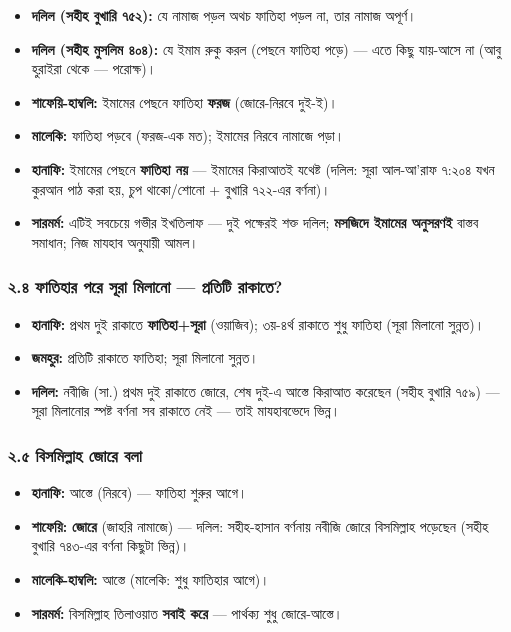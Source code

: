 \begin{itemize}
\item \textbf{দলিল (সহীহ বুখারি ৭৫২):} যে নামাজ পড়ল অথচ ফাতিহা পড়ল না, তার নামাজ অপূর্ণ।
\item \textbf{দলিল (সহীহ মুসলিম ৪০৪):} যে ইমাম রুকু করল (পেছনে ফাতিহা পড়ে) — এতে কিছু যায়-আসে না (আবু হুরাইরা থেকে — পরোক্ষ)।
\item \textbf{শাফেয়ি-হাম্বলি:} ইমামের পেছনে ফাতিহা \textbf{ফরজ} (জোরে-নিরবে দুই-ই)।
\item \textbf{মালেকি:} ফাতিহা পড়বে (ফরজ-এক মত); ইমামের নিরবে নামাজে পড়া।
\item \textbf{হানাফি:} ইমামের পেছনে \textbf{ফাতিহা নয়} — ইমামের কিরাআতই যথেষ্ট (দলিল: সূরা আল-আ'রাফ ৭:২০৪ যখন কুরআন পাঠ করা হয়, চুপ থাকো/শোনো + বুখারি ৭২২-এর বর্ণনা)।
\item \textbf{সারমর্ম:} এটিই সবচেয়ে গভীর ইখতিলাফ — দুই পক্ষেরই শক্ত দলিল; \textbf{মসজিদে ইমামের অনুসরণই} বাস্তব সমাধান; নিজ মাযহাব অনুযায়ী আমল।
\end{itemize}
\subsubsection*{২.৪ ফাতিহার পরে সূরা মিলানো — প্রতিটি রাকাতে?}

\begin{itemize}
\item \textbf{হানাফি:} প্রথম দুই রাকাতে \textbf{ফাতিহা+সূরা} (ওয়াজিব); ৩য়-৪র্থ রাকাতে শুধু ফাতিহা (সূরা মিলানো সুন্নত)।
\item \textbf{জমহুর:} প্রতিটি রাকাতে ফাতিহা; সূরা মিলানো সুন্নত।
\item \textbf{দলিল:} নবীজি (সা.) প্রথম দুই রাকাতে জোরে, শেষ দুই-এ আস্তে কিরাআত করেছেন (সহীহ বুখারি ৭৫৯) — সূরা মিলানোর স্পষ্ট বর্ণনা সব রাকাতে নেই — তাই মাযহাবভেদে ভিন্ন।
\end{itemize}
\subsubsection*{২.৫ বিসমিল্লাহ জোরে বলা}

\begin{itemize}
\item \textbf{হানাফি:} আস্তে (নিরবে) — ফাতিহা শুরুর আগে।
\item \textbf{শাফেয়ি:} \textbf{জোরে} (জাহরি নামাজে) — দলিল: সহীহ-হাসান বর্ণনায় নবীজি জোরে বিসমিল্লাহ পড়েছেন (সহীহ বুখারি ৭৪৩-এর বর্ণনা কিছুটা ভিন্ন)।
\item \textbf{মালেকি-হাম্বলি:} আস্তে (মালেকি: শুধু ফাতিহার আগে)।
\item \textbf{সারমর্ম:} বিসমিল্লাহ তিলাওয়াত \textbf{সবাই করে} — পার্থক্য শুধু জোরে-আস্তে।
\end{itemize}
